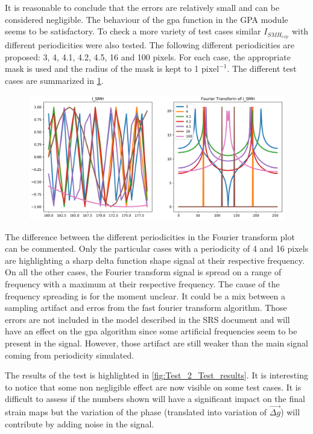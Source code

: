 \documentclass[12pt, titlepage]{article}
\begin{document}
It is reasonable to conclude that the errors are relatively small and can be considered negligible. The behaviour of the gpa function in the GPA module seems to be satisfactory. To check a more variety of test cases similar $I_{SMH_{exp}}$ with different periodicities were also tested. The following different periodicities are proposed: 3, 4, 4.1, 4.2, 4.5, 16 and 100 pixels. For each case, the appropriate mask is used and the radius of the mask is kept to 1 $\text{pixel}^{-1}$. The different test cases are summarized in \cref{fig:Test_2_Test_cases}. 

\begin{figure}[H]
\begin{center}
\includegraphics[scale=0.5]{Figures/Test_2_test_cases.png}
\caption{}
\label{fig:Test_2_Test_cases}
\end{center}
\end{figure}

The difference between the different periodicities in the Fourier transform plot can be commented. Only the particular cases with a periodicity of 4 and 16 pixels are highlighting a sharp delta function shape signal at their respective frequency. On all the other cases, the Fourier transform signal is spread on a range of frequency with a maximum at their respective frequency. The cause of the frequency spreading is for the moment unclear. It could be a mix between a sampling artifact and erros from the fast fourier transform algorithm. Those errors are not included in the model described in the SRS document and will have an effect on the gpa algorithm since some artificial frequencies seem to be present in the signal. However, those artifact are still weaker than the main signal coming from periodicity simulated.\medskip

The results of the test is highlighted in \cref{fig:Test_2_Test_results}. It is interesting to notice that some non negligible effect are now visible on some test cases. It is difficult to assess if the numbers shown will have a significant impact on the final strain maps but the variation of the phase (translated into variation of $\overrightarrow{\Delta g}$) will contribute by adding noise in the signal.
\end{document}
